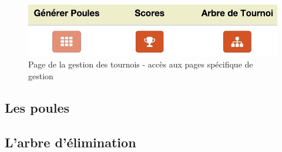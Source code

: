 \begin{figure}[H]
\centering
\includegraphics[scale=0.35]{gestion-tournois/gestion-tournois-operations.jpg}
\caption{Page de la gestion des tournois - accès aux pages spécifique de gestion}
\end{figure}

\subsection{Les poules}

\subsection{L'arbre d'élimination}